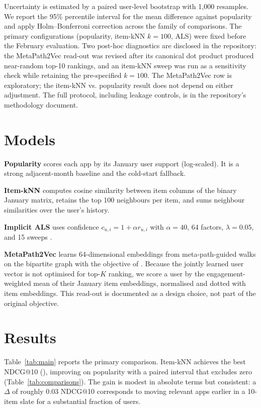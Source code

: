 \documentclass[11pt]{article}
\begin{document}
Uncertainty is estimated by a paired user-level bootstrap with 1{,}000 resamples. We report the 95\% percentile interval for the mean difference against popularity and apply Holm--Bonferroni correction across the family of comparisons. The primary configurations (popularity, item-kNN $k=100$, ALS) were fixed before the February evaluation. Two post-hoc diagnostics are disclosed in the repository: the MetaPath2Vec read-out was revised after its canonical dot product produced near-random top-10 rankings, and an item-kNN sweep was run as a sensitivity check while retaining the pre-specified $k=100$. The MetaPath2Vec row is exploratory; the item-kNN vs. popularity result does not depend on either adjustment. The full protocol, including leakage controls, is in the repository's methodology document.

\section{Models}

\textbf{Popularity} scores each app by its January user support (log-scaled). It is a strong adjacent-month baseline and the cold-start fallback.

\textbf{Item-kNN} computes cosine similarity between item columns of the binary January matrix, retains the top 100 neighbours per item, and sums neighbour similarities over the user's history.

\textbf{Implicit ALS} uses confidence $c_{u,i}=1+\alpha r_{u,i}$ with $\alpha=40$, 64 factors, $\lambda=0.05$, and 15 sweeps \citep{hu2008implicit}.

\textbf{MetaPath2Vec} learns 64-dimensional embeddings from meta-path-guided walks on the bipartite graph with the objective of \citet{dong2017metapath2vec}. Because the jointly learned user vector is not optimised for top-$K$ ranking, we score a user by the engagement-weighted mean of their January item embeddings, normalised and dotted with item embeddings. This read-out is documented as a design choice, not part of the original objective.

\section{Results}



Table~\ref{tab:main} reports the primary comparison. Item-kNN achieves the best NDCG@10 (\BestNDCG), improving on popularity with a paired interval that excludes zero (Table~\ref{tab:comparisons}). The gain is modest in absolute terms but consistent: a $\Delta$ of roughly 0.03 NDCG@10 corresponds to moving relevant apps earlier in a 10-item slate for a substantial fraction of users.
\end{document}
